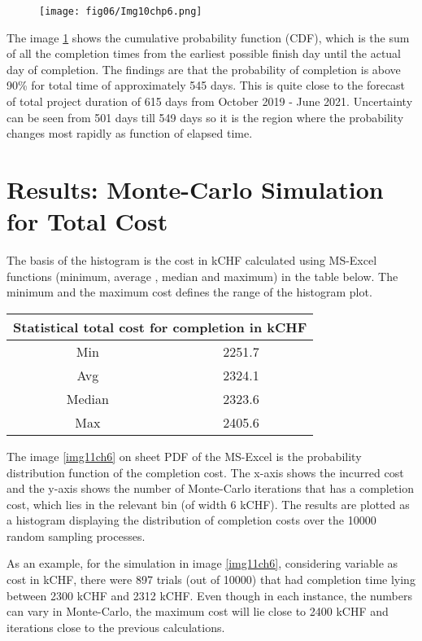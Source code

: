 \begin{figure}
	\centering
	\texttt{[image: fig06/Img10chp6.png]}
	\label{img10ch6}
\end{figure}


The image \ref{img10ch6} shows the cumulative probability function (CDF), which is the sum of all the completion times from the earliest possible finish day until the actual day of completion. The findings are that the probability of completion is above 90\% 
for total time of approximately 545 days. This is quite close to the forecast of total project duration of 615 days from October 2019 - June 2021. Uncertainty can be seen from 501 days till 549 days so it is the region where the probability changes most rapidly as function of elapsed time.


\section{Results: Monte-Carlo Simulation for  Total Cost}
The basis of the histogram is the cost in kCHF calculated using MS-Excel functions (minimum, average , median and maximum) in the table below. The minimum and the maximum cost defines the range of the histogram plot.
\begin{center}
	\begin{tabular}{ |c|c|} 
		\hline
		\multicolumn{2}{|c|}{Statistical total cost for completion in kCHF} \\
		\hline
		Min & 2251.7  \\
		\hline
		Avg &  2324.1\\ 
		\hline
		Median & 2323.6 \\ 
		\hline
		Max & 2405.6\\ 
		\hline
	\end{tabular}
\end{center}


The image \ref{img11ch6} on sheet PDF of the MS-Excel is the probability distribution function of the completion cost. The x-axis shows the incurred cost and the y-axis shows the number of Monte-Carlo iterations that has a completion cost, which lies in the relevant bin (of width 6 kCHF). The results are plotted as a histogram displaying the distribution of completion costs over the 10000 random sampling processes.  

As an example, for the simulation in image \ref{img11ch6}, considering variable as cost in kCHF, there were 897 trials (out of 10000) that had completion time lying between 2300 kCHF and 2312 kCHF. Even though in each instance, the numbers can vary in Monte-Carlo, the maximum cost will lie close to 2400 kCHF and iterations close to the previous calculations.


